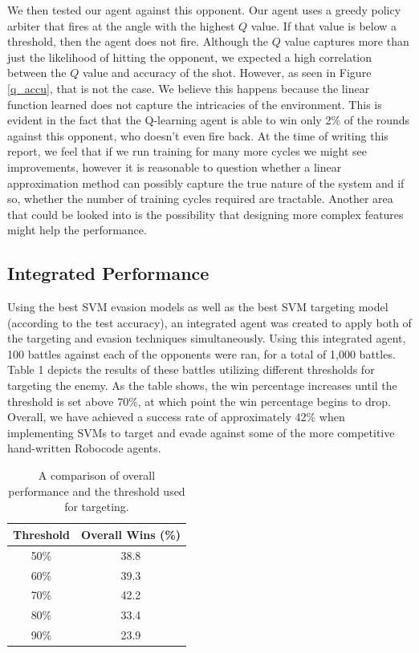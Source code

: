 \documentclass{article}
\theoremstyle{plain}
\theoremstyle{definition}
\theoremstyle{remark}
\begin{document}
We then tested our agent against this opponent. Our agent uses a greedy policy arbiter that fires at the angle with the highest $Q$ value. If that value is below a threshold, then the agent does not fire. Although the $Q$ value captures more than just the likelihood of hitting the opponent, we expected a high correlation between the $Q$ value and accuracy of the shot. However, as seen in Figure \ref{q_accu}, that is not the case. We believe this happens because the linear function learned does not capture the intricacies of the environment. This is evident in the fact that the Q-learning agent is able to win only 2\% of the rounds against this opponent, who doesn't even fire back. At the time of writing this report, we feel that if we run training for many more cycles we might see improvements, however it is reasonable to question whether a linear approximation method can possibly capture the true nature of the system and if so, whether the number of training cycles required are tractable. Another area that could be looked into is the possibility that designing more complex features might help the performance.

\subsection*{Integrated Performance}
Using the best SVM evasion models as well as the best SVM targeting model (according to the test accuracy), an integrated agent was created to apply both of the targeting and evasion techniques simultaneously. Using this integrated agent, 100 battles against each of the opponents were ran, for a total of 1,000 battles. Table 1 depicts the results of these battles utilizing different thresholds for targeting the enemy. As the table shows, the win percentage increases until the threshold is set above 70\%, at which point the win percentage begins to drop. Overall, we have achieved a success rate of approximately 42\% when implementing SVMs to target and evade against some of the more competitive hand-written Robocode agents. 

\begin{table}[h]
\centering
    \begin{tabular}{|c|c|}
        \hline
        \bf{Threshold} & \bf{Overall Wins (\%) }\\ \hline
        50\%      & 38.8   \\ \hline
        60\%      & 39.3   \\ \hline
        70\%      & 42.2   \\ \hline
        80\%      & 33.4   \\ \hline
        90\%      & 23.9   \\
        \hline
    \end{tabular}
\label{svm_thresh}
\caption{A comparison of overall performance and the threshold used for targeting.}
\end{table}
\end{document}
